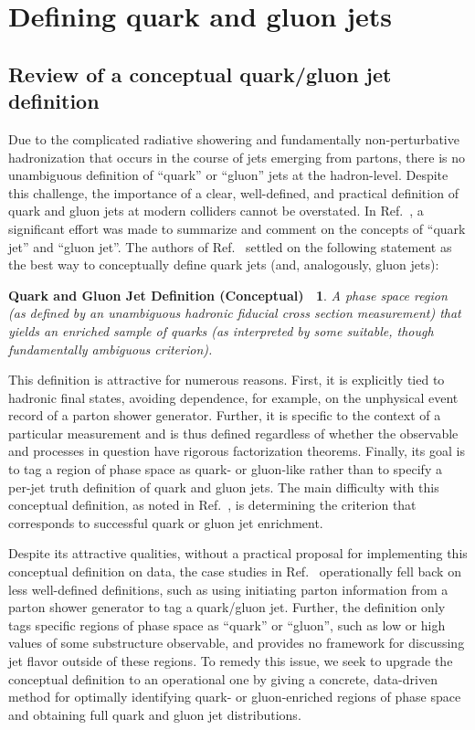 \documentclass[letterpaper,11pt]{article}
\DeclareRobustCommand{\Ref}[1]{Ref.~\cite{#1}}
\newtheorem*{conceptdef}{Quark and Gluon Jet Definition (Conceptual)~\cite{Gras:2017jty}}
\begin{document}
\section{Defining quark and gluon jets}
\label{sec:def}

\subsection{Review of a conceptual quark/gluon jet definition}
\label{sec:conceptdef}

Due to the complicated radiative showering and fundamentally non-perturbative hadronization that occurs in the course of jets emerging from partons, there is no unambiguous definition of ``quark'' or ``gluon'' jets at the hadron-level.
%
Despite this challenge, the importance of a clear, well-defined, and practical definition of quark and gluon jets at modern colliders cannot be overstated.
%
In \Ref{Gras:2017jty}, a significant effort was made to summarize and comment on the concepts of ``quark jet'' and ``gluon jet''.
%
The authors of \Ref{Gras:2017jty} settled on the following statement as the best way to conceptually define quark jets (and, analogously, gluon jets):
\clearpage
\begin{conceptdef}
A phase space region (as defined by an unambiguous hadronic fiducial cross section measurement) that yields an enriched sample of quarks (as interpreted by some suitable, though fundamentally ambiguous criterion).
\end{conceptdef}

This definition is attractive for numerous reasons.
%
First, it is explicitly tied to hadronic final states, avoiding dependence, for example, on the unphysical event record of a parton shower generator.
%
Further, it is specific to the context of a particular measurement and is thus defined regardless of whether the observable and processes in question have rigorous factorization theorems.
%
Finally, its goal is to tag a region of phase space as quark- or gluon-like rather than to specify a per-jet truth definition of quark and gluon jets.
%
The main difficulty with this conceptual definition, as noted in \Ref{Gras:2017jty}, is determining the criterion that corresponds to successful quark or gluon jet enrichment.


Despite its attractive qualities, without a practical proposal for implementing this conceptual definition on data, the case studies in \Ref{Gras:2017jty} operationally fell back on less well-defined definitions, such as using initiating parton information from a parton shower generator to tag a quark/gluon jet.
%
Further, the definition only tags specific regions of phase space as ``quark'' or ``gluon'', such as low or high values of some substructure observable, and provides no framework for discussing jet flavor outside of these regions.
%
To remedy this issue, we seek to upgrade the conceptual definition to an operational one by giving a concrete, data-driven method for optimally identifying quark- or gluon-enriched regions of phase space and obtaining full quark and gluon jet distributions.
\end{document}
